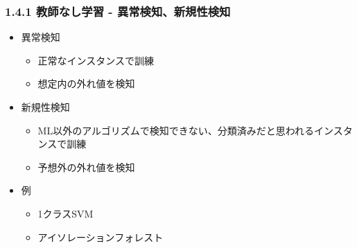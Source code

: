 \documentclass[aspectratio=169, dvipdfmx, 14pt, xcolor={svgnames,dvipsnames}]{beamer}
\def\tightlist{\itemsep1pt\parskip0pt\parsep0pt}
\begin{document}
\begin{frame}
  \frametitle{1.4.1 教師なし学習 - 異常検知、新規性検知}


  \begin{itemize}
    \tightlist
    \item
          異常検知

          \begin{itemize}
            \tightlist
            \item
                  正常なインスタンスで訓練
            \item
                  想定内の外れ値を検知
          \end{itemize}
    \item
          新規性検知

          \begin{itemize}
            \tightlist
            \item
                  ML以外のアルゴリズムで検知できない、分類済みだと思われるインスタンスで訓練
            \item
                  予想外の外れ値を検知
          \end{itemize}
    \item
          例

          \begin{itemize}
            \tightlist
            \item
                  1クラスSVM
            \item
                  アイソレーションフォレスト
          \end{itemize}
  \end{itemize}
\end{frame}

\end{document}
